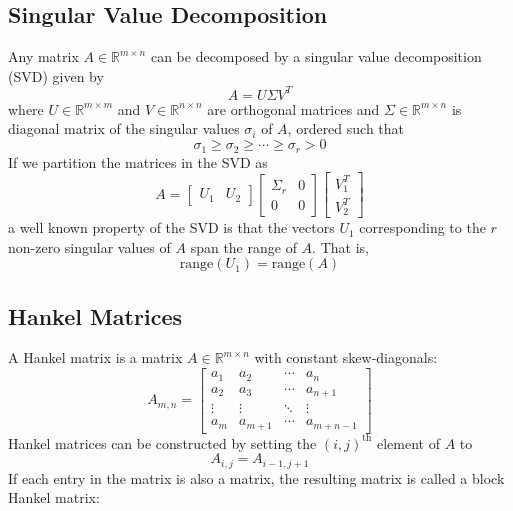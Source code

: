 \subsection{Singular Value Decomposition}
Any matrix $A \in \mathbb{R}^{m\times n}$ can be decomposed by a singular value decomposition (SVD) given by
\begin{equation*}
A = U\Sigma V^T
\end{equation*}
where $U \in \mathbb{R}^{m\times m}$ and $V \in \mathbb{R}^{n\times n}$ are orthogonal matrices and $\Sigma \in \mathbb{R}^{m\times n}$ is diagonal matrix of the singular values $\sigma_i$ of $A$, ordered such that
\begin{equation*}
\sigma_1 \geq \sigma_2 \geq \cdots \geq \sigma_r > 0
\end{equation*}
If we partition the matrices in the SVD as
\begin{equation*}
A = \left[\begin{array}{c|c}
U_1 & U_2
\end{array}\right]
\left[\begin{array}{c|c}
\Sigma_r & 0 \\ \hline 0 & 0
\end{array}\right]
\left[\begin{array}{c}
V_1^T \\ \hline V_2^T
\end{array}\right]
\end{equation*}
a well known property of the SVD is that the vectors $U_1$ corresponding to the $r$ non-zero singular values of $A$ span the range of $A$. That is,
\begin{equation*}
\mbox{range}(U_1) = \mbox{range}(A)
\end{equation*}

\subsection{Hankel Matrices}
A Hankel matrix is a matrix $A \in \mathbb{R}^{m\times n}$ with constant skew-diagonals:
\begin{equation*}
A_{m,n} = \begin{bmatrix}
a_1 & a_2 & \cdots & a_n\\
a_2 & a_3 & \cdots & a_{n+1}\\
\vdots & \vdots & \ddots & \vdots\\
a_m & a_{m+1} & \cdots & a_{m+n-1}
\end{bmatrix}
\end{equation*}
Hankel matrices can be constructed by setting the $(i,j)^{\mbox{th}}$ element of $A$ to
\begin{equation*}
A_{i,j} = A_{i-1, j+1}
\end{equation*}
If each entry in the matrix is also a matrix, the resulting matrix is called a block Hankel matrix:



